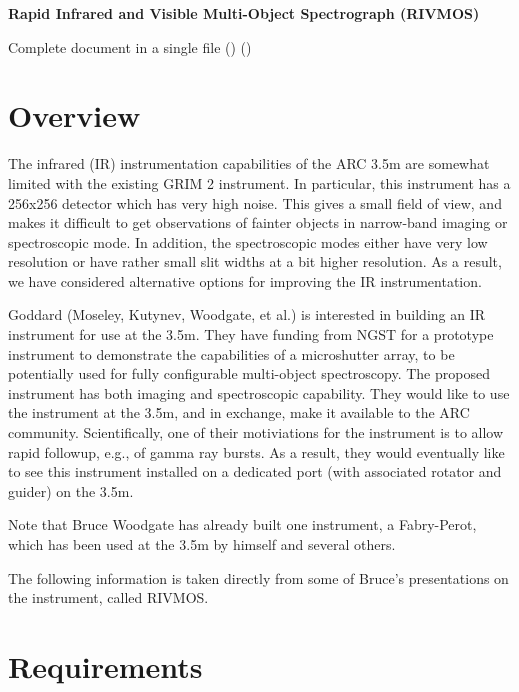 \documentclass{article}
\begin{document}
\begin{center}
\textbf{Rapid Infrared and Visible Multi-Object Spectrograph (RIVMOS)}
\end{center}

\begin{htmlonly}
Complete document in a single file
()
()
\end{htmlonly}

\section{Overview}

The infrared (IR) instrumentation capabilities of the ARC 3.5m are somewhat
limited with the existing GRIM 2 instrument. In particular, this instrument
has a 256x256 detector which has very high noise. This gives a small field
of view, and makes it difficult to get observations of fainter objects in
narrow-band imaging or spectroscopic mode. In addition, the spectroscopic
modes either have very low resolution or have rather small slit widths at
a bit higher resolution. As a result, we have considered alternative options
for improving the IR instrumentation.

Goddard (Moseley, Kutynev, Woodgate, et al.) is interested in building an IR instrument for
use at the 3.5m. They have funding from NGST for a prototype instrument 
to demonstrate the capabilities of a microshutter array, to
be potentially used for fully configurable multi-object spectroscopy. The
proposed instrument has both imaging and spectroscopic capability. They would
like to use the instrument at the 3.5m, and in exchange, make it available
to the ARC community. Scientifically, one of their motiviations for the
instrument is to allow rapid followup, e.g., of gamma ray bursts. As
a result, they would eventually like to see this instrument installed on
a dedicated port (with associated rotator and guider) on the 3.5m. 

Note that Bruce Woodgate has already built one instrument, a Fabry-Perot, which has
been used at the 3.5m by himself and several others.

The following information is taken directly from some of Bruce's presentations
on the instrument, called RIVMOS.

\section{Requirements}
\end{document}

